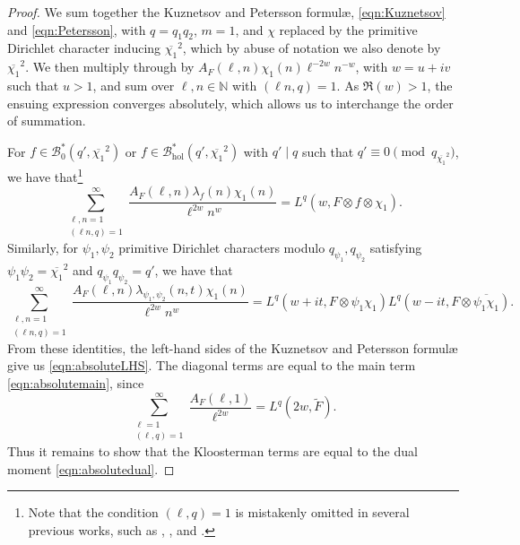 \documentclass[11pt,a4paper]{amsart}
\newcommand{\BB}{\mathcal{B}}
\newcommand{\hol}{\mathrm{hol}}
\newcommand{\N}{\mathbb{N}}
\numberwithin{equation}{section}
\theoremstyle{remark}
\theoremstyle{definition}
\begin{document}
\begin{proof}
We sum together the Kuznetsov and Petersson formul\ae{}, \eqref{eqn:Kuznetsov} and \eqref{eqn:Petersson}, with $q = q_1 q_2$, $m = 1$, and $\chi$ replaced by the primitive Dirichlet character inducing $\overline{\chi_1}^2$, which by abuse of notation we also denote by $\overline{\chi_1}^2$. We then multiply through by $A_F(\ell,n) \chi_1(n) \ell^{-2w} n^{-w}$, with $w = u + iv$ such that $u > 1$, and sum over $\ell,n \in \N$ with $(\ell n,q) = 1$. As $\Re(w) > 1$, the ensuing expression converges absolutely, which allows us to interchange the order of summation.

For $f \in \BB_0^{\ast}(q',\overline{\chi_1}^2)$ or $f \in \BB_{\hol}^{\ast}(q',\overline{\chi_1}^2)$ with $q' \mid q$ such that $q' \equiv 0 \pmod{q_{\overline{\chi_1}^2}}$, we have that\footnote{Note that the condition $(\ell,q) = 1$ is mistakenly omitted in several previous works, such as \cite[Section 2]{Blo12}, \cite[Lemma 2.1]{Hua21}, and \cite[(1.2)]{Qi19}.}
\[\sum_{\substack{\ell,n = 1 \\ (\ell n, q) = 1}}^{\infty} \frac{A_F(\ell,n) \lambda_f(n) \chi_1(n)}{\ell^{2w} n^w} = L^q(w,F \otimes f \otimes \chi_1).\]
Similarly, for $\psi_1,\psi_2$ primitive Dirichlet characters modulo $q_{\psi_1},q_{\psi_2}$ satisfying $\psi_1 \psi_2 = \overline{\chi_1}^2$ and $q_{\psi_1} q_{\psi_2} = q'$, we have that
\[\sum_{\substack{\ell,n = 1 \\ (\ell n, q) = 1}}^{\infty} \frac{A_F(\ell,n) \lambda_{\psi_1,\psi_2}(n,t) \chi_1(n)}{\ell^{2w} n^w} = L^q(w + it,F \otimes \psi_1 \chi_1) L^q(w - it,F \otimes \overline{\psi_1 \chi_1}).\]
From these identities, the left-hand sides of the Kuznetsov and Petersson formul\ae{} give us \eqref{eqn:absoluteLHS}. The diagonal terms are equal to the main term \eqref{eqn:absolutemain}, since
\[\sum_{\substack{\ell = 1 \\ (\ell, q) = 1}}^{\infty} \frac{A_F(\ell,1)}{\ell^{2w}} = L^q(2w,\widetilde{F}).\]
Thus it remains to show that the Kloosterman terms are equal to the dual moment \eqref{eqn:absolutedual}.


\end{proof}
\end{document}
